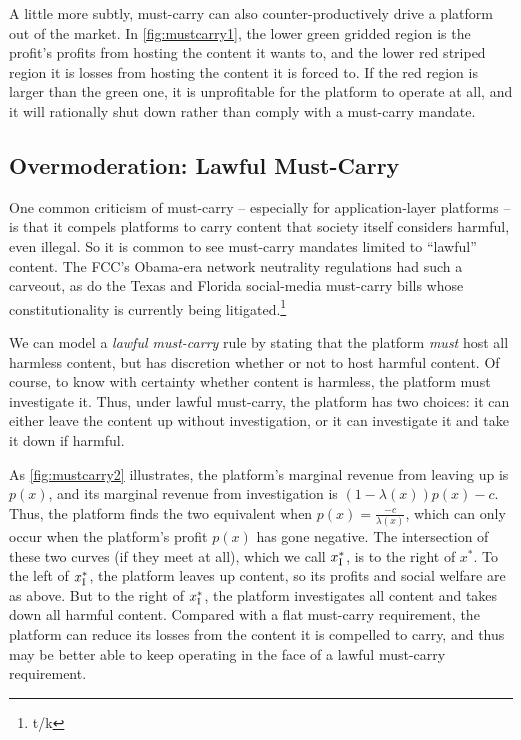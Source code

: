 A little more subtly, must-carry can also counter-productively drive a platform out of the market. In \autoref{fig:mustcarry1}, the lower green gridded region is the profit's profits from hosting the content it wants to, and the lower red striped region it is losses from hosting the content it is forced to. If the red region is larger than the green one, it is unprofitable for the platform to operate at all, and it will rationally shut down rather than comply with a must-carry mandate.

\subsection{Overmoderation: Lawful Must-Carry}

One common criticism of must-carry -- especially for application-layer platforms -- is that it compels platforms to carry content that society itself considers harmful, even illegal. So it is common to see must-carry mandates limited to ``lawful'' content. The FCC's Obama-era network neutrality regulations had such a carveout, as do the Texas and Florida social-media must-carry bills whose constitutionality is currently being litigated.\footnote{t/k}

We can model a \emph{lawful must-carry} rule by stating that the platform \emph{must} host all harmless content, but has discretion whether or not to host harmful content. Of course, to know with certainty whether content is harmless, the platform must investigate it. Thus, under lawful must-carry, the platform has two choices: it can either leave the content up without investigation, or it can investigate it and take it down if harmful. 

As \autoref{fig:mustcarry2} illustrates, the platform's marginal revenue from leaving up is $p(x)$, and its marginal revenue from investigation is $(1 - \lambda(x))p(x) -c $. Thus, the platform finds the two equivalent when $p(x) = \frac{-c}{\lambda(x)}$, which can only occur when the platform's profit $p(x)$ has gone negative. The intersection of these two curves (if they meet at all), which we call $x_{\text{I}}^*$, is to the right of $x^*$. To the left of $x_{\text{I}}^*$, the platform leaves up content, so its profits and social welfare are as above. But to the right of $x_{\text{I}}^*$, the platform investigates all content and takes down all harmful content. Compared with a flat must-carry requirement, the platform can reduce its losses from the content it is compelled to carry, and thus may be better able to keep operating in the face of a lawful must-carry requirement.


